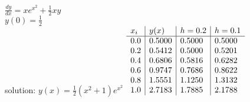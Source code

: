 {
$\displaystyle \frac{dy}{dx} = xe^{x^2}+\frac{1}{2}xy$\\
$y(0)=\frac{1}{2}$\\
solution: $\displaystyle y(x) = \frac{1}{2}(x^2+1)e^{x^2}$
}
{
	$\begin{array}[b]{l | l | l | l}
		x_i & y(x)   & h = 0.2 & h = 0.1 \\ \hline
		0.0 & 0.5000 & 0.5000  & 0.5000  \\
		0.2 & 0.5412 & 0.5000  & 0.5201  \\
		0.4 & 0.6806 & 0.5816  & 0.6282  \\
		0.6 & 0.9747 & 0.7686  & 0.8622  \\
		0.8 & 1.5551 & 1.1250  & 1.3132  \\
		1.0 & 2.7183 & 1.7885  & 2.1788
	\end{array}$
}
